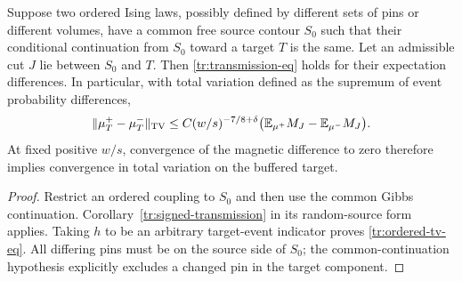 \begin{corollary}
\label{tr:ordered-tv}
Suppose two ordered Ising laws, possibly defined by different sets of
pins or different volumes, have a common free source contour $S_0$ such
that their conditional continuation from $S_0$ toward a target $T$ is the
same. Let an admissible cut $J$ lie between $S_0$ and $T$. Then
\eqref{tr:transmission-eq} holds for their expectation differences.
In particular, with total variation defined as the supremum of event
probability differences,
\begin{equation}
\label{tr:ordered-tv-eq}
 \|\mu_T^+-\mu_T^-\|_{\rm TV}
 \leq C(w/s)^{-7/8+\delta}
       \bigl(\mathbb E_{\mu^+}M_J-\mathbb E_{\mu^-}M_J\bigr).
\end{equation}
At fixed positive $w/s$, convergence of the magnetic difference to zero
therefore implies convergence in total variation on the buffered target.
\end{corollary}

\begin{proof}
Restrict an ordered coupling to $S_0$ and then use the common Gibbs
continuation. Corollary~\ref{tr:signed-transmission} in its random-source
form applies. Taking $h$ to be an arbitrary target-event indicator proves
\eqref{tr:ordered-tv-eq}. All differing pins must be on the source side of
$S_0$; the common-continuation hypothesis explicitly excludes a changed
pin in the target component.
\end{proof}

